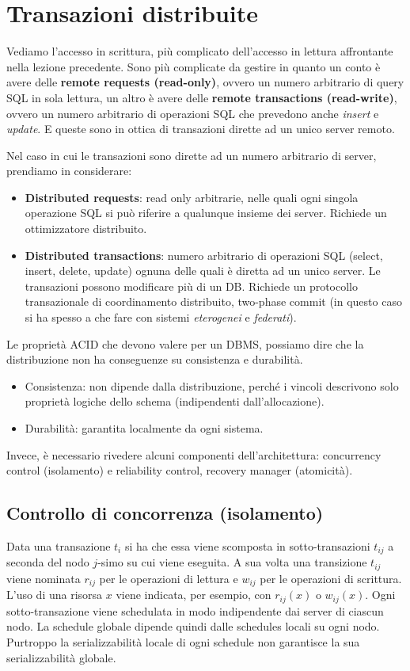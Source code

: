 \section{Transazioni distribuite}
Vediamo l'accesso in scrittura, più complicato dell'accesso in lettura affrontante nella lezione precedente. Sono più complicate da gestire in quanto un conto è avere delle \textbf{remote requests (read-only)}, ovvero un numero arbitrario di query SQL in sola lettura, un altro è avere delle \textbf{remote transactions (read-write)}, ovvero un numero arbitrario di operazioni SQL che prevedono anche \textit{insert} e \textit{update}. E queste sono in ottica di transazioni dirette ad un unico server remoto. 

Nel caso in cui le transazioni sono dirette ad un numero arbitrario di server, prendiamo in considerare:
\begin{itemize}
    \item \textbf{Distributed requests}: read only arbitrarie, nelle quali ogni singola operazione SQL si può riferire a qualunque insieme dei server. Richiede un ottimizzatore distribuito.
    \item \textbf{Distributed transactions}: numero arbitrario di operazioni SQL (select, insert, delete, update) ognuna delle quali è diretta ad un unico server. Le transazioni possono modificare più di un DB. Richiede un protocollo transazionale di coordinamento distribuito, two-phase commit (in questo caso si ha spesso a che fare con sistemi \textit{eterogenei} e \textit{federati}).
\end{itemize}
Le proprietà ACID che devono valere per un DBMS, possiamo dire  che la distribuzione non ha conseguenze su consistenza e durabilità. 
\begin{itemize}
    \item Consistenza: non dipende dalla distribuzione, perché i vincoli descrivono solo proprietà logiche dello schema (indipendenti dall’allocazione).
    \item Durabilità: garantita localmente da ogni sistema. 
\end{itemize} 
Invece, è necessario rivedere alcuni componenti dell’architettura: concurrency control (isolamento) e reliability control, recovery manager (atomicità).

\subsection{Controllo di concorrenza (isolamento)}
Data una transazione $t_i$ si ha che essa viene scomposta in sotto-transazioni $t_{ij}$ a seconda del nodo $j$-simo su cui viene eseguita. A sua volta una transizione $t_{ij}$ viene nominata $r_{ij}$ per le operazioni di lettura e $w_{ij}$ per le operazioni di scrittura. L'uso di una risorsa $x$ viene indicata, per esempio, con $r_{ij}(x)$ o $w_{ij}(x)$.
Ogni sotto-transazione viene schedulata in modo indipendente dai server di ciascun nodo. La schedule globale dipende quindi dalle schedules locali su ogni nodo. Purtroppo la serializzabilità locale di ogni schedule non garantisce la sua serializzabilità globale.

